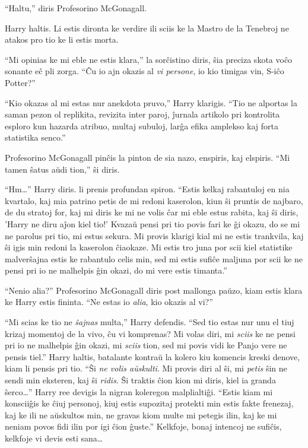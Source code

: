 ``Haltu,'' diris Profesorino McGonagall.

Harry haltis. Li estis dironta ke verdire ili sciis ke la Mastro de la
Tenebroj ne atakos pro tio ke li estis morta.

``Mi opinias ke mi eble ne estis klara,'' la sorĉistino diris, ŝia
preciza skota voĉo sonante eĉ pli zorga. ``Ĉu io ajn okazis al
\emph{vi persone}, io kio timigas vin, S-iĉo Potter?''

``Kio okazas al mi estas nur anekdota pruvo,'' Harry
klarigis. ``Tio ne alportas la saman pezon ol replikita, revizita inter
paroj, ĵurnala artikolo pri kontrolita esploro kun hazarda atribuo,
multaj subuloj, larĝa efika amplekso kaj forta statistika senco.''

Profesorino McGonagall pinĉis la pinton de sia nazo, enspiris, kaj
elspiris. ``Mi tamen ŝatus aŭdi tion,'' ŝi diris.

``Hm\ldots'' Harry diris. li prenis profundan spiron. ``Estis kelkaj
rabantuloj en nia kvartalo, kaj mia patrino petis de mi redoni
kaserolon, kiun ŝi pruntis de najbaro, de du stratoj for, kaj mi diris
ke mi ne volis ĉar mi eble estus rabita, kaj ŝi diris, 'Harry ne diru
aĵon kiel tio!' Kvazaŭ pensi pri tio povis fari ke ĝi okazu, do se mi
ne parolus pri tio, mi estus sekura. Mi provis klarigi kial mi ne
estis trankvila, kaj ŝi igis min redoni la kaserolon ĉiaokaze. Mi
estis tro juna por scii kiel statistike malverŝajna estis ke rabantulo
celis min, sed mi estis sufiĉe maljuna por scii ke ne pensi pri io ne
malhelpis ĝin okazi, do mi vere estis timanta.''

``Nenio alia?'' Profesorino McGonagall diris post mallonga paŭzo, kiam
estis klara ke Harry estis fininta. ``Ne estas io \emph{alia}, kio
okazis al vi?''

``Mi scias ke tio ne \emph{ŝajnas} multa,'' Harry defendis. ``Sed tio
estas nur unu el tiuj krizaj momentoj de la vivo, ĉu vi komprenas? Mi
volas diri, mi \emph{sciis} ke ne pensi pri io ne malhelpis ĝin okazi,
mi \emph{sciis} tion, sed mi povis vidi ke Panjo vere ne pensis
tiel.''  Harry haltis, batalante kontraŭ la kolero kiu komencis kreski
denove, kiam li pensis pri tio. ``Ŝi \emph{ne volis aŭskulti}. Mi
provis diri al ŝi, mi \emph{petis} ŝin ne sendi min eksteren, kaj ŝi
\emph{ridis}. Ŝi traktis ĉion kion mi diris, kiel ia granda
ŝerco\ldots'' Harry ree devigis la nigran koleregon
malplialtiĝi. ``Estis kiam mi konsciiĝis ke ĉiuj personoj, kiuj estis
supozitaj protekti min estis fakte frenezaj, kaj ke ili ne aŭskultos
min, ne gravas kiom multe mi petegis ilin, kaj ke mi neniam povos fidi
ilin por igi ĉion ĝuste.'' Kelkfoje, bonaj intencoj ne sufiĉis,
kelkfoje vi devis esti sana\ldots

